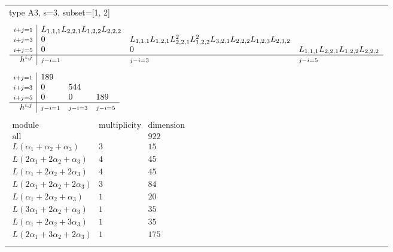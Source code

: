 \documentclass[crop,border=2mm]{standalone}
\begin{document}
\begin{tabular}{l}
{\huge type A3, s=3, subset=[1, 2]}\\ \\


$\displaystyle
\begin{array}{r|l l l}
	{\scriptstyle i+j=1}&L_{1,1,1}L_{2,2,1}L_{1,2,2}L_{2,2,2}&&\\
	{\scriptstyle i+j=3}&0&L_{1,1,1}L_{1,2,1}L_{2,2,1}^{2}L_{1,2,2}^{2}L_{3,2,1}L_{2,2,2}L_{1,2,3}L_{2,3,2}&\\
	{\scriptstyle i+j=5}&0&0&L_{1,1,1}L_{2,2,1}L_{1,2,2}L_{2,2,2}\\
	\hline h^{i,j}&{\scriptstyle j-i=1}&{\scriptstyle j-i=3}&{\scriptstyle j-i=5}
\end{array}
$ \\ \\


$\displaystyle
\begin{array}{r|l l l}
	{\scriptstyle i+j=1}&189&&\\
	{\scriptstyle i+j=3}&0&544&\\
	{\scriptstyle i+j=5}&0&0&189\\
	\hline h^{i,j}&{\scriptstyle j-i=1}&{\scriptstyle j-i=3}&{\scriptstyle j-i=5}
\end{array}
$ \\ \\


$\displaystyle
\begin{array}{rll}
	\text{module}&\text{multiplicity}&\text{dimension} \\ \hline \text{all}&&922 \\
	L\left(\alpha_{1}+\alpha_{2}+\alpha_{3}\right)&3&15\\
	L\left( 2\alpha_{1}+ 2\alpha_{2}+\alpha_{3}\right)&4&45\\
	L\left(\alpha_{1}+ 2\alpha_{2}+ 2\alpha_{3}\right)&4&45\\
	L\left( 2\alpha_{1}+ 2\alpha_{2}+ 2\alpha_{3}\right)&3&84\\
	L\left(\alpha_{1}+ 2\alpha_{2}+\alpha_{3}\right)&1&20\\
	L\left( 3\alpha_{1}+ 2\alpha_{2}+\alpha_{3}\right)&1&35\\
	L\left(\alpha_{1}+ 2\alpha_{2}+ 3\alpha_{3}\right)&1&35\\
	L\left( 2\alpha_{1}+ 3\alpha_{2}+ 2\alpha_{3}\right)&1&175
\end{array}
$ \\ \\

\end{tabular}
\end{document}
